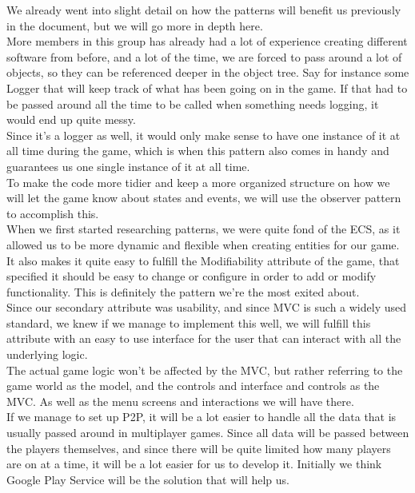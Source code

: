 We already went into slight detail on how the patterns will benefit us previously in the document, but we will go more in depth here.
\\More members in this group has already had a lot of experience creating different software from before, and a lot of the time, we are forced to pass around a lot of objects, so they can be referenced deeper in the object tree. Say for instance some Logger that will keep track of what has been going on in the game. If that had to be passed around all the time to be called when something needs logging, it would end up quite messy.
\\Since it's a logger as well, it would only make sense to have one instance of it at all time during the game, which is when this pattern also comes in handy and guarantees us one single instance of it at all time.
\\ To make the code more tidier and keep a more organized structure on how we will let the game know about states and events, we will use the observer pattern to accomplish this.
\\ When we first started researching patterns, we were quite fond of the ECS, as it allowed us to be more dynamic and flexible when creating entities for our game. It also makes it quite easy to fulfill the Modifiability attribute of the game, that specified it should be easy to change or configure in order to add or modify functionality. This is definitely the pattern we're the most exited about.
\\ Since our secondary attribute was usability, and since MVC is such a widely used standard, we knew if we manage to implement this well, we will fulfill this attribute with an easy to use interface for the user that can interact with all the underlying logic.
\\The actual game logic won't be affected by the MVC, but rather referring to the game world as the model, and the controls and interface and controls as the MVC. As well as the menu screens and interactions we will have there.
\\ If we manage to set up P2P, it will be a lot easier to handle all the data that is usually passed around in multiplayer games. Since all data will be passed between the players themselves, and since there will be quite limited how many players are on at a time, it will be a lot easier for us to develop it. Initially we think Google Play Service will be the solution that will help us.
